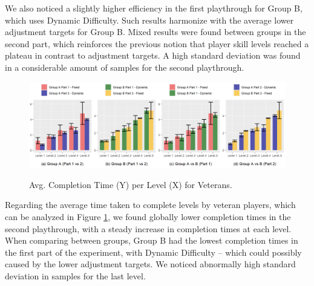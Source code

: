 We also noticed a slightly higher efficiency in the first playthrough for Group B, which uses Dynamic Difficulty. Such results harmonize with the average lower adjustment targets for Group B. Mixed results were found between groups in the second part, which reinforces the previous notion that player skill levels reached a plateau in contrast to adjustment targets. A high standard deviation was found in a considerable amount of samples for the second playthrough.

\begin{figure}[!ht]
    \begin{center}
    \caption{Avg. Completion Time (Y) per Level (X) for Veterans.}
        \includegraphics[width=\textwidth]{figures/completion_time-veteran_players.png}
        \label{fig:result-metric-veterans-completion-time}
    \end{center}
\end{figure}

Regarding the average time taken to complete levels by veteran players, which can be analyzed in Figure \ref{fig:result-metric-veterans-completion-time}, we found globally lower completion times in the second playthrough, with a steady increase in completion times at each level. When comparing between groups, Group B had the lowest completion times in the first part of the experiment, with Dynamic Difficulty -- which could possibly caused by the lower adjustment targets. We noticed abnormally high standard deviation in samples for the last level.

